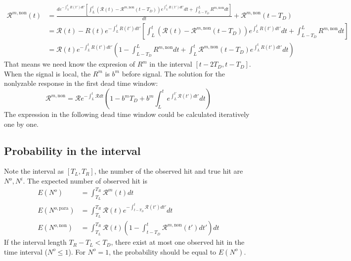 \begin{equation}
\begin{aligned}
\mathcal{R}^{m,\mathrm{non}}(t)&=\frac{d e^{-\int_{L}^{t}{R(t')dt'}}\left[\int_{L}^{t}{(\mathcal{R}(t)-\mathcal{R}^{m,\mathrm{non}}(t-T_D))e^{\int_{L}^{t}{R(t')dt'}}dt} + \int_{L-T_D}^{L}{R^{m,\mathrm{non}}dt}\right]}{dt}+\mathcal{R}^{m,\mathrm{non}}(t-T_D)\\
&=\mathcal{R}(t)-R(t)e^{-\int_{L}^{t}{R(t')dt'}}\left[\int_{L}^{t}{(\mathcal{R}(t)-\mathcal{R}^{m,\mathrm{non}}(t-T_D))e^{\int_{L}^{t}{R(t')dt'}}dt}+\int_{L-T_D}^{L}{R^{m,\mathrm{non}}dt}\right]\\
&=\mathcal{R}(t)e^{-\int_{L}^{t}{R(t')dt'}}(1-\int_{L-T_D}^{L}{R^{m,\mathrm{non}}dt}+\int_{L}^{t}{\mathcal{R}^{m,\mathrm{non}}(t-T_D)e^{\int_{L}^{t}{R(t')dt'}}dt})
\end{aligned}
\end{equation}
That means we need know the expresion of $R^m$ in the interval $[t-2T_D,t-T_D]$. When the signal is local, the $R^m$ is $b^m$ before signal. The solution for the nonlyzable response in the first dead time window:
\begin{equation}
	\mathcal{R}^{m,\mathrm{non}}=\mathcal{R}e^{-\int_{L}^t{\mathcal{R}dt}}(1-b^mT_D+b^m\int^{t}_{L}{e^{\int_{L}^{t'}{\mathcal{R}(t')dt'}}dt})
\end{equation}
The expression in the following dead time window could be calculated iteratively one by one.

\subsection{Probability in the interval}
Note the interval as $[T_L, T_R]$, the number of the observed hit and true hit are $N^{o}, N^{i}$. The expected number of observed hit is 
\begin{equation}
\begin{aligned}
E(N^{o})&=\int_{T_L}^{T_R}{\mathcal{R}^m(t)dt}\\
E(N^{o,\mathrm{para}})&=\int_{T_L}^{T_R}{\mathcal{R}(t)e^{-\int_{t-T_D}^{t}{\mathcal{R}(t')dt'}}dt}\\
E(N^{o,\mathrm{non}})&=\int_{T_L}^{T_R}{\mathcal{R}(t)(1-\int_{t-T_D}^{t}{\mathcal{R}^{m,\mathrm{non}}(t')dt'})dt}
\end{aligned}
\end{equation}
If the interval length $T_R-T_L<T_D$, there exist at most one observed hit in the time interval ($N^o\leq1$). For $N^o=1$, the probability should be equal to $E(N^o)$.

